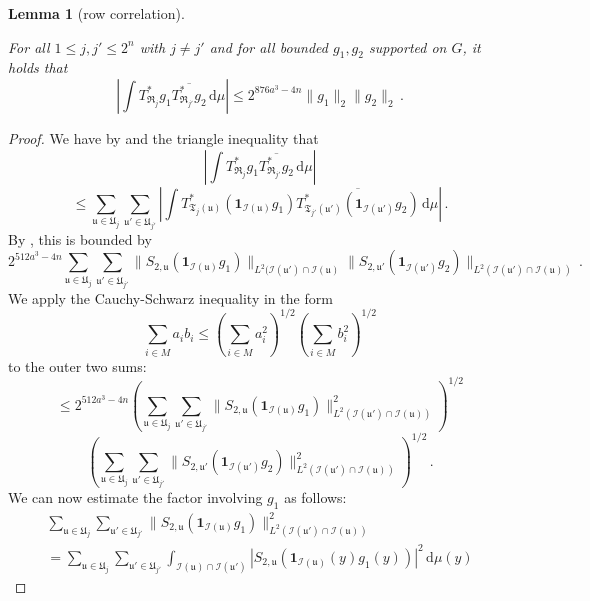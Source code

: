 \documentclass[10pt,a4paper]{article}
\theoremstyle{plain}
\newtheorem{lemma}[theorem]{Lemma}
\theoremstyle{definition}
\numberwithin{equation}{subsection}
\newcommand{\fu}{{\mathfrak u}}
\newcommand{\fU}{{\mathfrak U}}
\newcommand{\fT}{{\mathfrak T}}
\newcommand{\scI}{{\mathcal{I}}} %
\newcommand{\lean}[1]{}
\newcommand{\uses}[1]{}
\newcommand{\leanok}{}
\begin{document}
\begin{lemma}[row correlation]
    \label{row-correlation}
    \leanok
    \lean{TileStructure.Forest.row_correlation}
    \uses{adjoint-tree-control,correlation-separated-trees}
    For all $1 \le j,j' \le 2^n$ with $j\ne j'$ and for all bounded $g_1, g_2$ supported on $G$, it holds that
    $$
        \left| \int T_{\mathfrak{R}_j}^*g_1 \overline{T_{\mathfrak{R}_{j'}}^*g_2} \, \mathrm{d}\mu \right| \le
        2^{876a^3-4n}\|g_1\|_2 \|g_2\|_2\,.
    $$
\end{lemma}

\begin{proof}
    \leanok
    We have by  and the triangle inequality that
    $$
        \left| \int T_{\mathfrak{R}_j}^*g_1 \overline{T_{\mathfrak{R}_{j'}}^*g_2} \, \mathrm{d}\mu \right|
    $$
    $$
        \le \sum_{\fu \in \fU_j} \sum_{\fu' \in \fU_{j'}} \left| \int T^*_{\fT_j(\fu)} (\mathbf{1}_{\scI(\fu)} g_1) \overline{T^*_{\fT_{j'}(\fu')} (\mathbf{1}_{\scI(\fu')} g_2)} \, \mathrm{d}\mu \right|\,.
    $$
    By , this is bounded by
    \begin{equation}
        \label{eq-S2uu'}
         2^{512a^3-4n} \sum_{\fu \in \fU_j} \sum_{\fu' \in \fU_{j'}} \|S_{2,\fu} (\mathbf{1}_{\scI(\fu)}g_1)\|_{L^2(\scI(\fu')\cap \scI(\fu)} \|S_{2, \fu'} (\mathbf{1}_{\scI(\fu')}g_2)\|_{L^2(\scI(\fu')\cap\scI(\fu))}\,.
    \end{equation}
    We apply the Cauchy-Schwarz inequality in the form
    \begin{equation*}
        \sum_{i \in M} a_i b_i \le (\sum_{i \in M} a_i^2 )^{1/2}(\sum_{i \in M} b_i^2 )^{1/2}
    \end{equation*} to the outer two sums:
    $$
        \le 2^{512a^3-4n} \left(\sum_{\fu \in \fU_j} \sum_{\fu' \in \fU_{j'}} \|S_{2,\fu} (\mathbf{1}_{\scI(\fu)}g_1)\|_{L^2(\scI(\fu')\cap \scI(\fu))}^2 \right)^{1/2}
    $$
    $$
        \left(\sum_{\fu \in \fU_j} \sum_{\fu' \in \fU_{j'}} \|S_{2,\fu'} (\mathbf{1}_{\scI(\fu')}g_2)\|_{L^2(\scI(\fu')\cap\scI(\fu))}^2 \right)^{1/2}\,.
    $$
    We can now estimate the factor involving $g_1$ as follows:
    \begin{multline*}
        \sum_{\fu \in \fU_j}\sum_{\fu' \in \fU_{j'}} \|S_{2,\fu} (\mathbf{1}_{\scI(\fu)}g_1)\|_{L^2(\scI(\fu')\cap \scI(\fu))}^2
        \\ = \sum_{\fu \in \fU_j}\sum_{\fu' \in \fU_{j'}} \int_{\scI(\fu) \cap \scI(\fu')} |S_{2,\fu} (\mathbf{1}_{\scI(\fu)}(y)g_1(y))|^2 \, \mathrm{d}\mu(y)

\end{multline*}
\end{proof}
\end{document}
